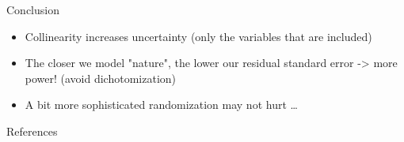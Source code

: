 \documentclass[english]{beamer}\usepackage[]{graphicx}\usepackage[]{xcolor}
\begin{document}
\begin{frame}{Conclusion}

\begin{itemize}
\item Collinearity increases uncertainty (only the variables that are included)
\item The closer we model "nature", the lower our residual standard error -> more power! (avoid dichotomization)
\item A bit more sophisticated randomization may not hurt \dots\end{itemize}


\end{frame}
\begin{frame}{References}
  \small
  


\end{frame}


\end{document}
